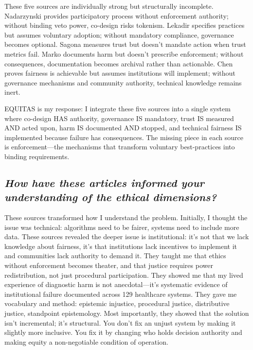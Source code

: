 \documentclass[12pt,a4paper]{article}
\begin{document}
These five sources are individually strong but structurally incomplete. Nadarzynski provides participatory process without enforcement authority; without binding veto power, co-design risks tokenism. Lekadir specifies practices but assumes voluntary adoption; without mandatory compliance, governance becomes optional. Sagona measures trust but doesn't mandate action when trust metrics fail. Marko documents harm but doesn't prescribe enforcement; without consequences, documentation becomes archival rather than actionable. Chen proves fairness is achievable but assumes institutions will implement; without governance mechanisms and community authority, technical knowledge remains inert.

EQUITAS is my response: I integrate these five sources into a single system where co-design HAS authority, governance IS mandatory, trust IS measured AND acted upon, harm IS documented AND stopped, and technical fairness IS implemented because failure has consequences. The missing piece in each source is enforcement—the mechanisms that transform voluntary best-practices into binding requirements.

\subsection*{\textit{How have these articles informed your understanding of the ethical dimensions?}}

These sources transformed how I understand the problem. Initially, I thought the issue was technical: algorithms need to be fairer, systems need to include more data. These sources revealed the deeper issue is institutional: it's not that we lack knowledge about fairness, it's that institutions lack incentives to implement it and communities lack authority to demand it. They taught me that ethics without enforcement becomes theater, and that justice requires power redistribution, not just procedural participation. They showed me that my lived experience of diagnostic harm is not anecdotal—it's systematic evidence of institutional failure documented across 129 healthcare systems. They gave me vocabulary and method: epistemic injustice, procedural justice, distributive justice, standpoint epistemology. Most importantly, they showed that the solution isn't incremental; it's structural. You don't fix an unjust system by making it slightly more inclusive. You fix it by changing who holds decision authority and making equity a non-negotiable condition of operation.

\end{document}
